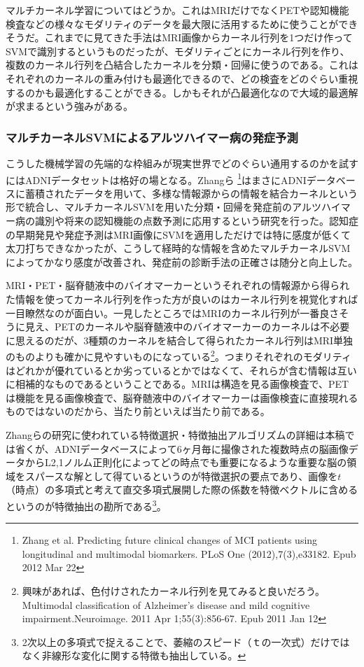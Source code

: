 マルチカーネル学習についてはどうか。これはMRIだけでなくPETや認知機能検査などの様々なモダリティのデータを最大限に活用するために使うことができそうだ。これまでに見てきた手法はMRI画像からカーネル行列を1つだけ作ってSVMで識別するというものだったが、モダリティごとにカーネル行列を作り、複数のカーネル行列を凸結合したカーネルを分類・回帰に使うのである。これはそれぞれのカーネルの重み付けも最適化できるので、どの検査をどのぐらい重視するのかも最適化することができる。しかもそれが凸最適化なので大域的最適解が求まるという強みがある。
\subsubsection{マルチカーネルSVMによるアルツハイマー病の発症予測}
こうした機械学習の先端的な枠組みが現実世界でどのぐらい通用するのかを試すにはADNIデータセットは格好の場となる。Zhangら
\footnote{Zhang et al. Predicting future clinical changes of MCI patients using longitudinal and multimodal biomarkers. PLoS One (2012),7(3),e33182. Epub 2012 Mar 22}はまさにADNIデータベースに蓄積されたデータを用いて、多様な情報源からの情報を結合カーネルという形で統合し、マルチカーネルSVMを用いた分類・回帰を発症前のアルツハイマー病の識別や将来の認知機能の点数予測に応用するという研究を行った。認知症の早期発見や発症予測はMRI画像にSVMを適用しただけでは特に感度が低くて太刀打ちできなかったが、こうして経時的な情報を含めたマルチカーネルSVMによってかなり感度が改善され、発症前の診断手法の正確さは随分と向上した。

MRI・PET・脳脊髄液中のバイオマーカーというそれぞれの情報源から得られた情報を使ってカーネル行列を作った方が良いのはカーネル行列を視覚化すれば一目瞭然なのが面白い。一見したところではMRIのカーネル行列が一番良さそうに見え、PETのカーネルや脳脊髄液中のバイオマーカーのカーネルは不必要に思えるのだが、3種類のカーネルを結合して得られたカーネル行列はMRI単独のものよりも確かに見やすいものになっている\footnote{興味があれば、色付けされたカーネル行列を見てみると良いだろう。Multimodal classification of Alzheimer's disease and mild cognitive impairment.Neuroimage. 2011 Apr 1;55(3):856-67. Epub 2011 Jan 12}。つまりそれぞれのモダリティはどれかが優れているとか劣っているとかではなくて、それらが含む情報は互いに相補的なものであるということである。MRIは構造を見る画像検査で、PETは機能を見る画像検査で、脳脊髄液中のバイオマーカーは画像検査に直接現れるものではないのだから、当たり前といえば当たり前である。

Zhangらの研究に使われている特徴選択・特徴抽出アルゴリズムの詳細は本稿では省くが、ADNIデータベースによって6ヶ月毎に撮像された複数時点の脳画像データからL2,1ノルム正則化によってどの時点でも重要になるような重要な脳の領域をスパースな解として得ているというのが特徴選択の要点であり、画像を$t$（時点）の多項式と考えて直交多項式展開した際の係数を特徴ベクトルに含めるというのが特徴抽出の勘所である\footnote{2次以上の多項式で捉えることで、萎縮のスピード（ｔの一次式）だけではなく非線形な変化に関する特徴も抽出している。}。

